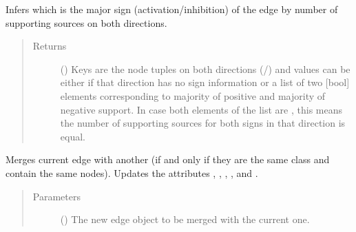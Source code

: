 \documentclass[letterpaper,10pt,english]{sphinxmanual}
\begin{document}
\begin{fulllineitems}

\begin{fulllineitems}
\label{\detokenize{reference:pypath.main.Direction.majority_sign}}
Infers which is the major sign (activation/inhibition) of the
edge by number of supporting sources on both directions.
\begin{quote}\begin{description}
\item[{Returns}] \leavevmode
() \textendash{} Keys are the node tuples on both directions
(/) and values can be
either  if that direction has no sign information or
a list of two {[}bool{]} elements corresponding to majority of
positive and majority of negative support. In case both
elements of the list are , this means the number of
supporting sources for both signs in that direction is
equal.

\end{description}\end{quote}

\end{fulllineitems}


\begin{fulllineitems}
\label{\detokenize{reference:pypath.main.Direction.merge}}
Merges current edge with another (if and only if they are the
same class and contain the same nodes). Updates the attributes
, , ,
,  and
.
\begin{quote}\begin{description}
\item[{Parameters}] \leavevmode
{} ({\hyperref[\detokenize{reference:pypath.main.Direction}]{}}) \textendash{} The new edge object to be merged with the current one.


\end{description}
\end{quote}
\end{fulllineitems}
\end{fulllineitems}
\end{document}
